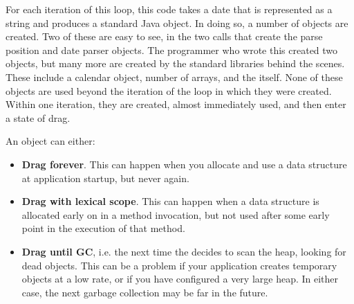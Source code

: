 For each iteration of this loop, this code takes a date that is represented as a
string and produces a standard Java  object. In doing so, a number
of objects are created. Two of these are easy to see, in the two 
calls that create the parse position and date parser objects. The programmer who
wrote this created two objects, but many more are created by the standard
libraries behind the scenes. These include a calendar object, number of arrays,
and the  itself. None of these objects are used beyond the iteration
of the loop in which they were created. Within one iteration, they are created,
almost immediately used, and then enter a state of drag.


An object can either:

\begin{itemize}
  \item \textbf{Drag forever}. This can happen when you allocate and
  use a data structure at application startup, but never again.
\item \textbf{Drag with lexical
scope}. This can happen when a data structure is allocated early on in a
method invocation, but not used after some early point in the execution of that method.
\item \textbf{Drag until GC}, i.e. the next time the \jre decides to scan the
heap, looking for dead objects. This can be a problem if your application creates temporary
objects at a low rate, or if you have configured a very large heap. In either
case, the next garbage collection may be far in the future.
\end{itemize} 

